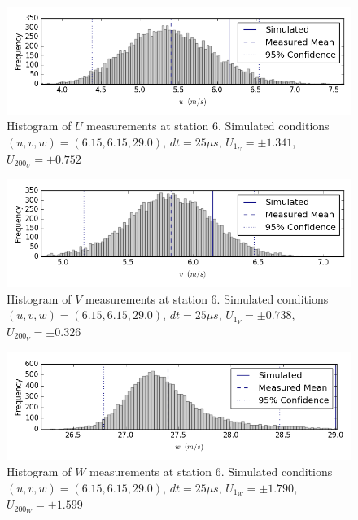 \begin{figure}[H]
\centering
\includegraphics[width=6in]{figs/Ely_May28th06001/uncertainty_Ely_May28th06001_U}
\caption{Histogram of $U$ measurements at station 6. Simulated conditions $(u,v,w)=(6.15, 6.15, 29.0)$, $dt=25 \mu s$, $U_1_U=\pm 1.341$, $U_200_U=\pm 0.752$}
\label{fig:uncertainty_Ely_May28th06001_U}
\end{figure}


\begin{figure}[H]
\centering
\includegraphics[width=6in]{figs/Ely_May28th06001/uncertainty_Ely_May28th06001_V}
\caption{Histogram of $V$ measurements at station 6. Simulated conditions $(u,v,w)=(6.15, 6.15, 29.0)$, $dt=25 \mu s$, $U_1_V=\pm 0.738$, $U_200_V=\pm 0.326$}
\label{fig:uncertainty_Ely_May28th06001_V}
\end{figure}


\begin{figure}[H]
\centering
\includegraphics[width=6in]{figs/Ely_May28th06001/uncertainty_Ely_May28th06001_W}
\caption{Histogram of $W$ measurements at station 6. Simulated conditions $(u,v,w)=(6.15, 6.15, 29.0)$, $dt=25 \mu s$, $U_1_W=\pm 1.790$, $U_200_W=\pm 1.599$}
\label{fig:uncertainty_Ely_May28th06001_W}
\end{figure}


